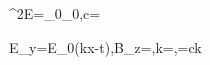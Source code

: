 \nabla^2\mathbf E=\mu_0\varepsilon_0,\qquad c=

E_y=E_0\cos(kx-\omega t),\quad B_z=,\quad k=\frac{2\pi}{\lambda},\quad\omega=ck
